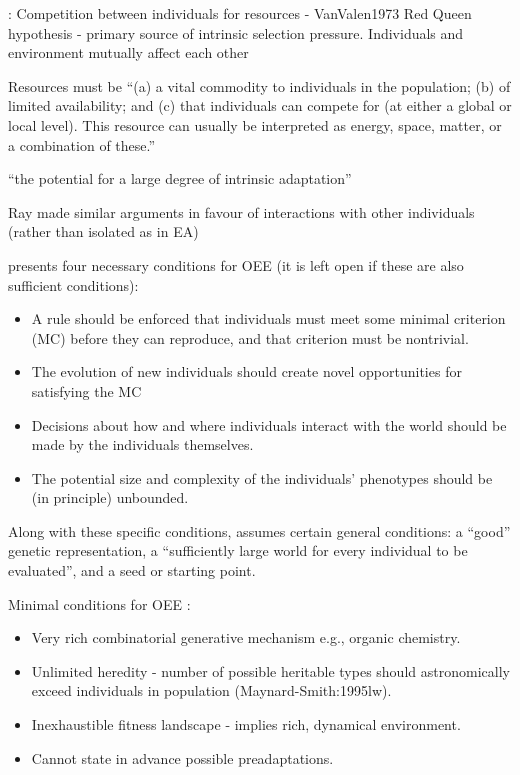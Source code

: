 \autocite{Taylor2001}:
Competition between individuals for resources - VanValen1973 Red Queen
hypothesis - primary source of intrinsic selection pressure.
Individuals and environment mutually affect each other

Resources must be ``(a) a vital commodity to individuals in the population; (b) of limited availability; and (c) that individuals can compete for (at either a global or local level). This resource can usually be interpreted as energy, space, matter, or a combination of these.''

``the potential for a large degree of intrinsic adaptation''

Ray made similar arguments in favour of interactions with other individuals (rather than isolated as in EA) 		

\autocite{Soros2014} presents four necessary conditions for OEE (it is left open if these are also sufficient conditions):
\begin{itemize}
\item A rule should be enforced that individuals must meet some minimal criterion (MC) before they can reproduce, and that criterion must be nontrivial.
\item The evolution of new individuals should create novel opportunities for satisfying the MC
\item Decisions about how and where individuals interact with the world should be made by the individuals themselves.
\item The potential size and complexity of the individuals' phenotypes should be (in principle) unbounded.
\end{itemize}
Along with these specific conditions, \autocite{Soros2014} assumes certain general conditions: a ``good'' genetic representation, a ``sufficiently large world for every individual to be evaluated'', and a seed or starting point.

Minimal conditions for OEE \autocite{Vasas2015}:
\begin{itemize}
\item
Very rich combinatorial generative mechanism e.g., organic chemistry.
\item
Unlimited heredity - number of possible heritable types should astronomically exceed individuals in population (Maynard-Smith:1995lw).
\item
Inexhaustible fitness landscape - implies rich, dynamical environment.
\item
Cannot state in advance possible preadaptations.
\end{itemize}

